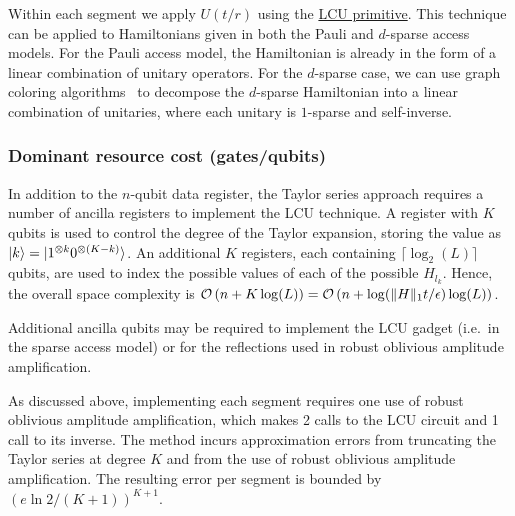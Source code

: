 \begin{refsection}
Within each segment we apply $U(t/r)$ using the \hyperref[prim:LCU]{LCU primitive}. This technique can be applied to Hamiltonians given in both the Pauli and $d$-sparse access models. For the Pauli access model, the Hamiltonian is already in the form of a linear combination of unitary operators. For the $d$-sparse case, we can use graph coloring algorithms~\cite{berry2005EffQAlgSimmSparseHam,childs2010StarHamiltonianSimulation} to decompose the $d$-sparse Hamiltonian into a linear combination of unitaries, where each unitary is $1$-sparse and self-inverse.




\subsubsection*{Dominant resource cost (gates/qubits)}

In addition to the $n$-qubit data register, the Taylor series approach requires a number of ancilla registers to implement the LCU technique. A register with $K$ qubits is used to control the degree of the Taylor expansion, storing the value as $\lvert k\rangle = \lvert1^{\otimes k} 0^{\otimes (K-k) }\rangle$. An additional $K$ registers, each containing $\lceil \log_2(L) \rceil$ qubits, are used to index the possible values of each of the possible $H_{l_k}$. Hence, the overall space complexity is $\mathcal{O}\left( n + K\log(L) \right) = \mathcal{O}\left( n + \log(\lVert H\rVert_1 t/\epsilon)\log(L) \right)$.

Additional ancilla qubits may be required to implement the LCU gadget (i.e.~in the sparse access model) or for the reflections used in robust oblivious amplitude amplification. 


As discussed above, implementing each segment requires one use of robust oblivious amplitude amplification, which makes 2 calls to the LCU circuit and 1 call to its inverse. The method incurs approximation errors from truncating the Taylor series at degree $K$ and from the use of robust oblivious amplitude amplification. The resulting error per segment is bounded by $\left(e \ln{2}/(K+1) \right)^{K+1}$.


\end{refsection}
